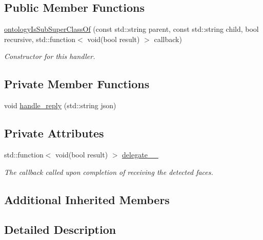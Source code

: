 \subsection*{Public Member Functions}
\begin{DoxyCompactItemize}
\item 
\hyperlink{classrapp_1_1cloud_1_1ontologyIsSubSuperClassOf_ae498a2ccfc4db700c39b163b73870d72}{ontology\-Is\-Sub\-Super\-Class\-Of} (const std\-::string parent, const std\-::string child, bool recursive, std\-::function$<$ void(bool result) $>$ callback)
\begin{DoxyCompactList}\small\item\em Constructor for this handler. \end{DoxyCompactList}\end{DoxyCompactItemize}
\subsection*{Private Member Functions}
\begin{DoxyCompactItemize}
\item 
void \hyperlink{classrapp_1_1cloud_1_1ontologyIsSubSuperClassOf_a579c9d44e2017b2a9db3ff938672645e}{handle\-\_\-reply} (std\-::string json)
\end{DoxyCompactItemize}
\subsection*{Private Attributes}
\begin{DoxyCompactItemize}
\item 
std\-::function$<$ void(bool result) $>$ \hyperlink{classrapp_1_1cloud_1_1ontologyIsSubSuperClassOf_a119bd48f23d64fc2f652cb53d2b21151}{delegate\-\_\-\-\_\-}
\begin{DoxyCompactList}\small\item\em The callback called upon completion of receiving the detected faces. \end{DoxyCompactList}\end{DoxyCompactItemize}
\subsection*{Additional Inherited Members}


\subsection{Detailed Description}


